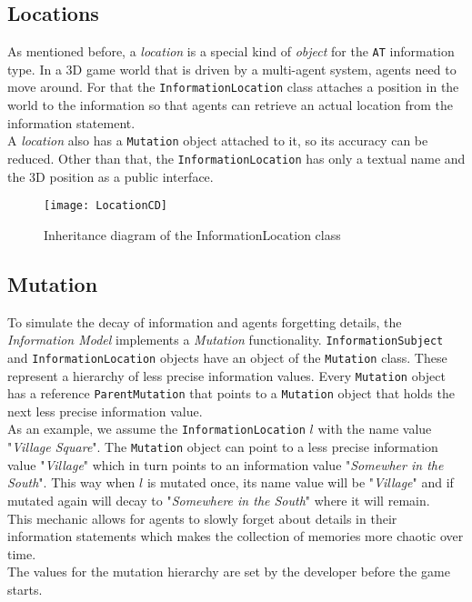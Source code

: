 \subsection{Locations}
As mentioned before, a \textit{location} is a special kind of \textit{object} for the \verb|AT| information type. In a 3D game world that is driven by a multi-agent system, agents need to move around. For that the \verb|InformationLocation| class attaches a position in the world to the information so that agents can retrieve an actual location from the information statement.\\
A \textit{location} also has a \verb|Mutation| object attached to it, so its accuracy can be reduced. Other than that, the \verb|InformationLocation| has only a textual name and the 3D position as a public interface.
\begin{figure}
	\centering
	\texttt{[image: LocationCD]}
	\caption{Inheritance diagram of the InformationLocation class}
	\label{fig:locationCD}
\end{figure}
\subsection{Mutation}
\label{section:mutation}
To simulate the decay of information and agents forgetting details, the \textit{Information Model} implements a \textit{Mutation} functionality. \verb|InformationSubject| and \verb|InformationLocation| objects have an object of the \verb|Mutation| class. These represent a hierarchy of less precise information values. Every \verb|Mutation| object has a reference \verb|ParentMutation| that points to a \verb|Mutation| object that holds the next less precise information value.\\
As an example, we assume the \verb|InformationLocation| $l$ with the name value "\textit{Village Square}". The \verb|Mutation| object can point to a less precise information value "\textit{Village}" which in turn points to an information value "\textit{Somewher in the South}". This way when $l$ is mutated once, its name value will be "\textit{Village}" and if mutated again will decay to "\textit{Somewhere in the South}" where it will remain.\\
This mechanic allows for agents to slowly forget about details in their information statements which makes the collection of memories more chaotic over time.\\
The values for the mutation hierarchy are set by the developer before the game starts.
